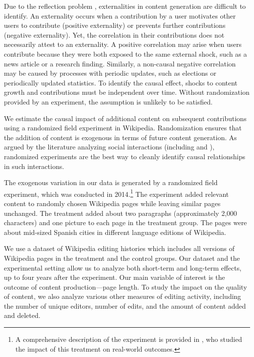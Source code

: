 \documentclass[12pt]{article}
\begin{document}
Due to the reflection problem \citep{manski-1993}, externalities in content generation are difficult to identify. An externality occurs when a contribution by a user motivates other users to contribute (positive externality) or prevents further contributions (negative externality). Yet, the correlation in their contributions does not necessarily attest to an externality. A positive correlation may arise when users contribute because they were both exposed to the same external shock, such as a news article or a research finding. Similarly, a non-causal negative correlation may be caused by processes with periodic updates, such as elections or periodically updated statistics. To identify the causal effect, shocks to content growth and contributions must be independent over time. Without randomization provided by an experiment, the assumption is unlikely to be satisfied.

We estimate the causal impact of additional content on subsequent contributions using a randomized field experiment in Wikipedia. Randomization ensures that the addition of content is exogenous in terms of future content generation. As argued by the literature analyzing social interactions (including \cite{manski-1993} and \cite{aaltonen-seiler-2016}), randomized experiments are the best way to cleanly identify causal relationships in such interactions.

The exogenous variation in our data is generated by a randomized field experiment, which was conducted in 2014.\footnote{A comprehensive description of the experiment is provided in \cite{hinnosaar2017wikipedia}, who studied the impact of this treatment on real-world outcomes.} The experiment added relevant content to randomly chosen Wikipedia pages while leaving similar pages unchanged. The treatment added about two paragraphs (approximately 2,000 characters) and one picture to each page in the treatment group. The pages were about mid-sized Spanish cities in different language editions of Wikipedia.

We use a dataset of Wikipedia editing histories which includes all versions of Wikipedia pages in the treatment and the control groups. Our dataset and the experimental setting allow us to analyze both short-term and long-term effects, up to four years after the experiment. Our main variable of interest is the outcome of content production---page length. To study the impact on the quality of content, we also analyze various other measures of editing activity, including the number of unique editors, number of edits, and the amount of content added and deleted.
\end{document}
